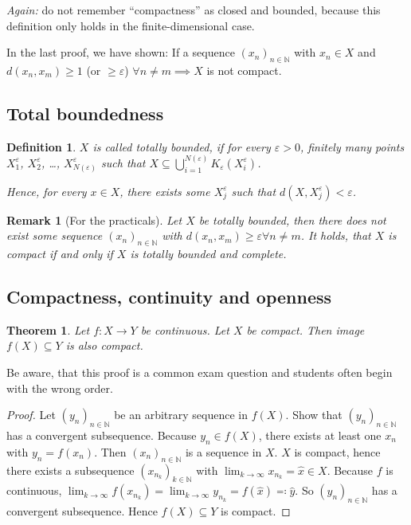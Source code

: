 \documentclass{article}
\newtheorem{theorem}{Theorem}  \numberwithin{theorem}{section}
\newtheorem{definition}{Definition}  \numberwithin{definition}{section}
\newtheorem{remark}{Remark}  \numberwithin{remark}{section}
\begin{document}
\emph{Again:} do not remember \enquote{compactness} as closed and bounded, because this definition only holds in the finite-dimensional case.

In the last proof, we have shown: If a sequence $(x_n)_{n \in \mathbb N}$ with $x_n \in X$ and $d(x_n, x_m) \geq 1$ (or $\geq \varepsilon$) $\forall n \neq m \implies X$ is not compact.

\subsection{Total boundedness}

\begin{definition}
  $X$ is called totally bounded, if for every $\varepsilon > 0$, finitely many points $X_1^\varepsilon$, $X_2^\varepsilon$, \dots, $X_{N(\varepsilon)}^\varepsilon$ such that $X \subseteq \bigcup_{i=1}^{N(\varepsilon)} K_{\varepsilon}(X_i^\varepsilon)$.

  Hence, for every $x \in X$, there exists some $X_j^\varepsilon$ such that $d(X, X_j^\varepsilon) < \varepsilon$.
\end{definition}

\begin{remark}[For the practicals]
  Let $X$ be totally bounded, then there does not exist some sequence $(x_n)_{n \in \mathbb N}$ with $d(x_n, x_m) \geq \varepsilon \forall n \neq m$. It holds, that $X$ is compact if and only if $X$ is totally bounded and complete.
\end{remark}

\subsection{Compactness, continuity and openness}
\begin{theorem} %
  \label{satz6}
  Let $f: X \to Y$ be continuous. Let $X$ be compact. Then image $f(X) \subseteq Y$ is also compact.
\end{theorem}

Be aware, that this proof is a common exam question and students often begin with the wrong order.

\begin{proof}
  Let $(y_n)_{n \in \mathbb N}$ be an arbitrary sequence in $f(X)$. Show that $(y_n)_{n\in\mathbb N}$ has a convergent subsequence.
  Because $y_n \in f(X)$, there exists at least one $x_n$ with $y_n = f(x_n)$.
  Then $(x_n)_{n \in \mathbb N}$ is a sequence in $X$. $X$ is compact, hence there exists a subsequence $(x_{n_k})_{k \in \mathbb N}$ with $\lim_{k\to\infty} x_{n_k} = \hat{x} \in X$. Because $f$ is continuous, $\lim_{k\to\infty} f(x_{n_k}) = \lim_{k\to\infty} y_{n_k} = f(\hat{x}) \eqqcolon \hat{y}$.
  So $(y_n)_{n\in\mathbb N}$ has a convergent subsequence. Hence $f(X) \subseteq Y$ is compact.
\end{proof}
\end{document}
